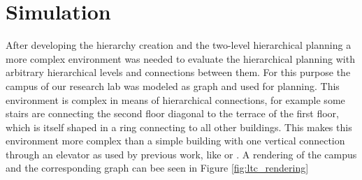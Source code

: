 \section{Simulation}
\label{sec:simulation}
After developing the hierarchy creation and the two-level hierarchical planning a more complex environment was needed to evaluate the hierarchical planning with arbitrary hierarchical levels and connections between them. For this purpose the campus of our research lab was modeled as graph and used for planning. This environment is complex in means of hierarchical connections, for example some stairs are connecting the second floor diagonal to the terrace of the first floor, which is itself shaped in a ring connecting to all other buildings. This makes this environment more complex than a simple building with one vertical connection through an elevator as used by previous work, like \cite{gregoric_autonomous_2022} or \cite{cagigas_hierarchical_2005}. A rendering of the campus and the corresponding graph can bee seen in Figure \ref{fig:ltc_rendering}


